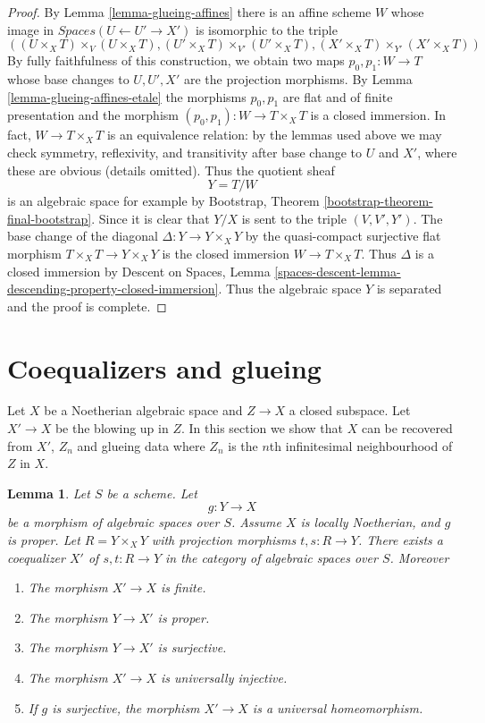 \documentclass{stacks-project}
\theoremstyle{plain}
\newtheorem{lemma}[subsection]{Lemma}
\theoremstyle{definition}
\theoremstyle{remark}
\numberwithin{equation}{subsection}
\begin{document}
\begin{proof}
\medskip\noindent
By Lemma \ref{lemma-glueing-affines} there is an affine scheme $W$ whose
image in $\textit{Spaces}(U \leftarrow U' \to X')$ is isomorphic to
the triple
$$
((U \times_X T) \times_V (U \times_X T),
(U' \times_X T) \times_{V'} (U' \times_X T),
(X' \times_X T) \times_{Y'} (X' \times_X T))
$$
By fully faithfulness of this construction, we obtain
two maps $p_0, p_1 : W \to T$ whose base changes
to $U, U', X'$ are the projection morphisms.
By Lemma \ref{lemma-glueing-affines-etale}
the morphisms $p_0, p_1$ are flat and of finite presentation and
the morphism $(p_0, p_1) : W \to T \times_X T$ is a closed immersion.
In fact, $W \to T \times_X T$ is an equivalence relation: by the lemmas
used above we may check symmetry, reflexivity, and transitivity
after base change to $U$ and $X'$, where these are obvious (details omitted).
Thus the quotient sheaf
$$
Y = T/W
$$
is an algebraic space for example by
Bootstrap, Theorem \ref{bootstrap-theorem-final-bootstrap}.
Since it is clear that $Y/X$ is sent to the triple $(V, V', Y')$.
The base change of the diagonal $\Delta : Y \to Y \times_X Y$
by the quasi-compact surjective flat morphism $T \times_X T \to Y \times_X Y$
is the closed immersion $W \to T \times_X T$. Thus $\Delta$
is a closed immersion by Descent on Spaces, Lemma
\ref{spaces-descent-lemma-descending-property-closed-immersion}.
Thus the algebraic space $Y$ is separated and the proof is complete.
\end{proof}








\section{Coequalizers and glueing}
\label{section-coequalizer-glue}

\noindent
Let $X$ be a Noetherian algebraic space and $Z \to X$ a closed subspace.
Let $X' \to X$ be the blowing up in $Z$. In this section we show that
$X$ can be recovered from $X'$, $Z_n$ and glueing data where $Z_n$
is the $n$th infinitesimal neighbourhood of $Z$ in $X$.

\begin{lemma}
\label{lemma-coequalizer}
Let $S$ be a scheme. Let
$$
g : Y \longrightarrow X
$$
be a morphism of algebraic spaces over $S$. Assume $X$ is locally Noetherian,
and $g$ is proper. Let $R = Y \times_X Y$ with projection morphisms
$t, s : R \to Y$. There exists a coequalizer $X'$ of $s, t : R \to Y$
in the category of algebraic spaces over $S$. Moreover
\begin{enumerate}
\item The morphism $X' \to X$ is finite.
\item The morphism $Y \to X'$ is proper.
\item The morphism $Y \to X'$ is surjective.
\item The morphism $X' \to X$ is universally injective.
\item If $g$ is surjective, the morphism $X' \to X$
is a universal homeomorphism.
\end{enumerate}
\end{lemma}
\end{document}
